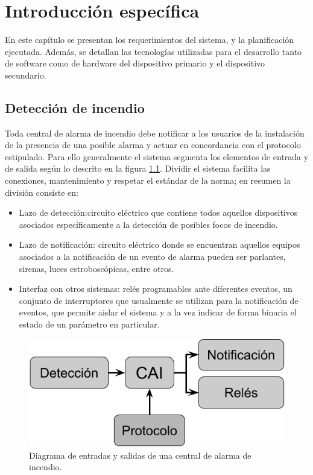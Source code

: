 \chapter{Introducción específica} %

\label{Chapter2}


En este capítulo se presentan los requerimientos del sistema, y la planificación ejecutada. Además, se detallan las tecnologías utilizadas para el desarrollo tanto de software como de
hardware del dispositivo primario y el dispositivo secundario.

\section{Detección de incendio}

Toda central de alarma de incendio debe notificar a los usuarios de la instalación de la presencia de una posible alarma y actuar en concordancia con el protocolo estipulado. Para ello generalmente el sistema segmenta los elementos de entrada y de salida según lo descrito en la figura \ref{fig:figura_a1}. Dividir el sistema facilita las conexiones, mantenimiento y respetar el estándar de la norma; en resumen la división consiste en: 

\begin{itemize}
\item  Lazo de detección:circuito eléctrico que contiene todos aquellos dispositivos asociados específicamente a la detección de posibles focos de incendio.
\item  Lazo de notificación: circuito eléctrico donde se encuentran aquellos equipos asociados a la notificación de un evento de alarma pueden ser parlantes, sirenas, luces estroboscópicas, entre otros.
\item  Interfaz con otros sistemas: relés programables ante diferentes eventos, un conjunto de interruptores que usualmente se utilizan para la notificación de eventos, que permite aislar el sistema y a la vez indicar de forma binaria el estado de un parámetro en particular.
\end{itemize}

\begin{figure}[h]
	\centering
	\includegraphics[scale=.45]{./Figures/Capitulo2/Figura_A.png}
	\caption{Diagrama de entradas y salidas de una central de alarma de incendio.}
	\label{fig:figura_a1}
\end{figure}

